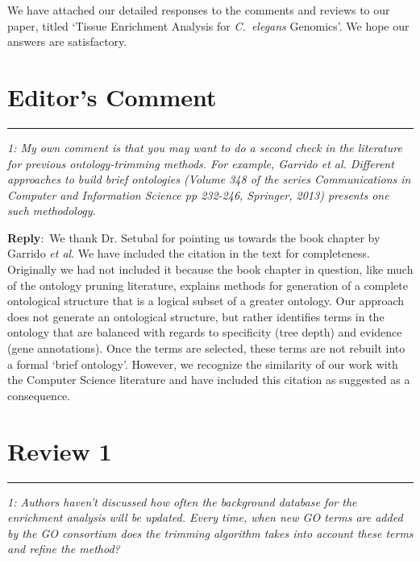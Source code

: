 \documentclass[12pt]{article}
\newcommand{\pointRaised}[2]{\medskip \hrule \noindent 
                \textsl{{\fontseries{b} #1}: #2}}
\newcommand{\reply}{\noindent \textbf{Reply}:\ }
\begin{document}

We have attached our detailed responses to the comments and reviews to our paper, titled `Tissue Enrichment Analysis for \emph{C.~elegans} Genomics'. We hope our answers are satisfactory.  

\section{Editor's Comment}
 \pointRaised{1}{My own comment is that you may want to do a second check in the literature for previous ontology-trimming methods. For example, Garrido et al. Different approaches to build brief ontologies (Volume 348 of the series Communications in Computer and Information Science pp 232-246, Springer, 2013) presents one such methodology. }
 
 \reply{We thank Dr. Setubal for pointing us towards the book chapter by Garrido \emph{et al}. We have included the citation in the text for completeness. Originally we had not included it because the book chapter in question, like much of the ontology pruning literature, explains methods for generation of a complete ontological structure that is a logical subset of a greater ontology. Our approach does not generate an ontological structure, but rather identifies terms in the ontology that are balanced with regards to specificity (tree depth) and evidence (gene annotations). Once the terms are selected, these terms are not rebuilt into a formal `brief ontology'. However, we recognize the similarity of our work with the Computer Science literature and have included this citation as suggested as a consequence. 
  }


\section{Review 1}

\pointRaised{1}{Authors haven’t discussed how often the background database for the enrichment analysis will be updated. Every time, when new GO terms are added by the GO consortium does the trimming algorithm takes into account these terms and refine the method?
}
\end{document}
